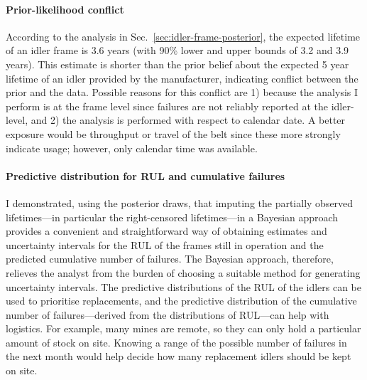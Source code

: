 \paragraph*{Prior-likelihood conflict}
According to the analysis in Sec.~\ref{sec:idler-frame-posterior}, the expected lifetime of an idler frame is $3.6$ years (with 90\% lower and upper bounds of 3.2 and 3.9 years). This estimate is shorter than the prior belief about the expected 5 year lifetime of an idler provided by the manufacturer, indicating conflict between the prior and the data. Possible reasons for this conflict are 1) because the analysis I perform is at the frame level since failures are not reliably reported at the idler-level, and 2) the analysis is performed with respect to calendar date. A better exposure would be throughput or travel of the belt since these more strongly indicate usage; however, only calendar time was available.

\paragraph*{Predictive distribution for RUL and cumulative failures}
I demonstrated, using the posterior draws, that imputing the partially observed lifetimes---in particular the right-censored lifetimes---in a Bayesian approach provides a convenient and straightforward way of obtaining estimates and uncertainty intervals for the RUL of the frames still in operation and the predicted cumulative number of failures. The Bayesian approach, therefore, relieves the analyst from the burden of choosing a suitable method for generating uncertainty intervals. The predictive distributions of the RUL of the idlers can be used to prioritise replacements, and the predictive distribution of the cumulative number of failures---derived from the distributions of RUL---can help with logistics. For example, many mines are remote, so they can only hold a particular amount of stock on site. Knowing a range of the possible number of failures in the next month would help decide how many replacement idlers should be kept on site.

